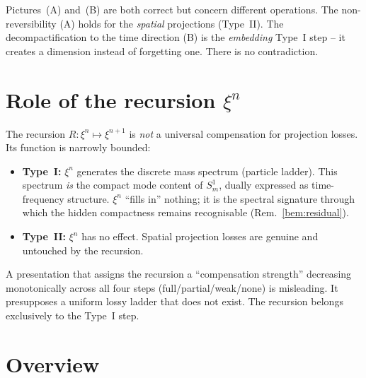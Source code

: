 \begin{corollary}
Pictures~(A) and~(B) are both correct but concern different operations. The
non-reversibility (A) holds for the \emph{spatial} projections (Type~II). The
decompactification to the time direction (B) is the \emph{embedding} Type~I
step -- it creates a dimension instead of forgetting one. There is no
contradiction.
\end{corollary}

\section{Role of the recursion $\xi^n$}

The recursion $R:\xi^n \mapsto \xi^{n+1}$ is \emph{not} a universal compensation
for projection losses. Its function is narrowly bounded:
\begin{itemize}
  \item \textbf{Type~I:} $\xi^n$ generates the discrete mass spectrum (particle
  ladder). This spectrum \emph{is} the compact mode content of $S^1_m$, dually
  expressed as time-frequency structure. $\xi^n$ ``fills in'' nothing; it is the
  spectral signature through which the hidden compactness remains recognisable
  (Rem.~\ref{bem:residual}).
  \item \textbf{Type~II:} $\xi^n$ has no effect. Spatial projection losses are
  genuine and untouched by the recursion.
\end{itemize}

\begin{remark}
A presentation that assigns the recursion a ``compensation strength'' decreasing
monotonically across all four steps (full/partial/weak/none) is misleading. It
presupposes a uniform lossy ladder that does not exist. The recursion belongs
exclusively to the Type~I step.
\end{remark}

\section{Overview}

